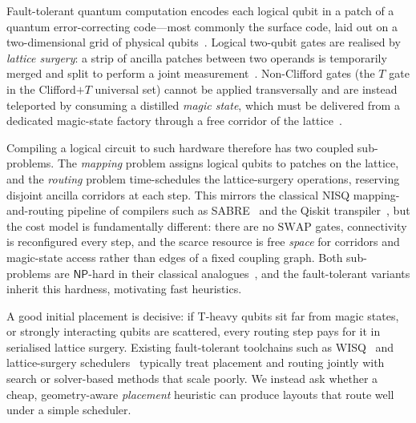 \documentclass[10pt,conference]{IEEEtran}
\theoremstyle{definition}
\theoremstyle{remark}
\newcommand{\SWAP}{\mathrm{SWAP}}
\newcommand{\NP}{\mathsf{NP}}
\begin{document}
Fault-tolerant quantum computation encodes each logical qubit in a patch of a
quantum error-correcting code---most commonly the surface code, laid out on a
two-dimensional grid of physical qubits~\cite{fowler2012surface}. Logical
two-qubit gates are realised by \emph{lattice surgery}: a strip of ancilla
patches between two operands is temporarily merged and split to perform a
joint measurement~\cite{horsman2012lattice,litinski2019game}. Non-Clifford
gates (the $T$ gate in the Clifford$+T$ universal set) cannot be applied
transversally and are instead teleported by consuming a distilled \emph{magic
state}, which must be delivered from a dedicated magic-state factory through a
free corridor of the lattice~\cite{bravyi2005magic}.

Compiling a logical circuit to such hardware therefore has two coupled
sub-problems. The \emph{mapping} problem assigns logical qubits to patches on
the lattice, and the \emph{routing} problem time-schedules the lattice-surgery
operations, reserving disjoint ancilla corridors at each step. This mirrors the
classical NISQ mapping-and-routing pipeline of compilers such as
SABRE~\cite{li2019sabre} and the Qiskit transpiler~\cite{qiskit}, but the cost model is fundamentally
different: there are no $\SWAP{}$ gates, connectivity is reconfigured every step,
and the scarce resource is free \emph{space} for corridors and magic-state
access rather than edges of a fixed coupling graph. Both sub-problems are
$\NP$-hard in their classical analogues~\cite{siraichi2018qubit}, and the
fault-tolerant variants inherit this hardness, motivating fast heuristics.

A good initial placement is decisive: if T-heavy qubits sit far from magic
states, or strongly interacting qubits are scattered, every routing step pays
for it in serialised lattice surgery. Existing fault-tolerant toolchains such as
WISQ~\cite{wisq} and lattice-surgery schedulers~\cite{beverland2022surface}
typically treat placement and routing jointly with search or solver-based
methods that scale poorly. We instead ask whether a cheap, geometry-aware
\emph{placement} heuristic can produce layouts that route well under a simple
scheduler.
\end{document}
